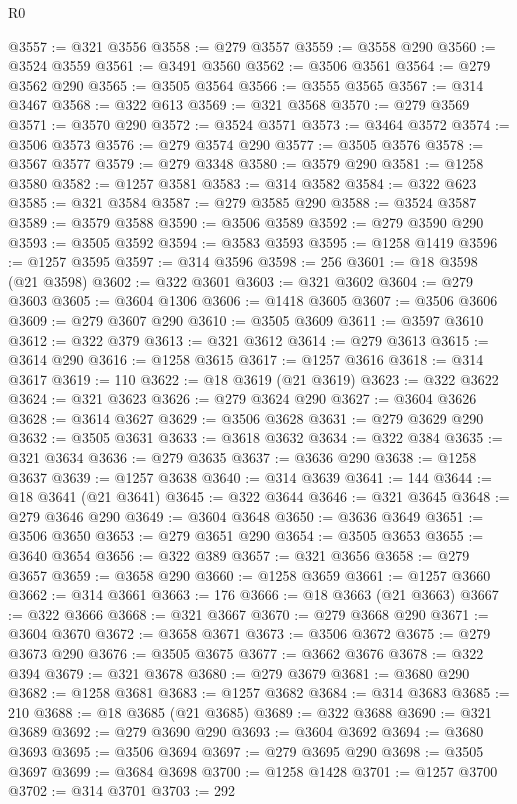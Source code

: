 \begin{lexlean}{R0}
\begin{coremodule}
@3557 := @321 @3556
@3558 := @279 @3557
@3559 := @3558 @290
@3560 := @3524 @3559
@3561 := @3491 @3560
@3562 := @3506 @3561
@3564 := @279 @3562 @290
@3565 := @3505 @3564
@3566 := @3555 @3565
@3567 := @314 @3467
@3568 := @322 @613
@3569 := @321 @3568
@3570 := @279 @3569
@3571 := @3570 @290
@3572 := @3524 @3571
@3573 := @3464 @3572
@3574 := @3506 @3573
@3576 := @279 @3574 @290
@3577 := @3505 @3576
@3578 := @3567 @3577
@3579 := @279 @3348
@3580 := @3579 @290
@3581 := @1258 @3580
@3582 := @1257 @3581
@3583 := @314 @3582
@3584 := @322 @623
@3585 := @321 @3584
@3587 := @279 @3585 @290
@3588 := @3524 @3587
@3589 := @3579 @3588
@3590 := @3506 @3589
@3592 := @279 @3590 @290
@3593 := @3505 @3592
@3594 := @3583 @3593
@3595 := @1258 @1419
@3596 := @1257 @3595
@3597 := @314 @3596
@3598 := 256
@3601 := @18 @3598 (@21 @3598)
@3602 := @322 @3601
@3603 := @321 @3602
@3604 := @279 @3603
@3605 := @3604 @1306
@3606 := @1418 @3605
@3607 := @3506 @3606
@3609 := @279 @3607 @290
@3610 := @3505 @3609
@3611 := @3597 @3610
@3612 := @322 @379
@3613 := @321 @3612
@3614 := @279 @3613
@3615 := @3614 @290
@3616 := @1258 @3615
@3617 := @1257 @3616
@3618 := @314 @3617
@3619 := 110
@3622 := @18 @3619 (@21 @3619)
@3623 := @322 @3622
@3624 := @321 @3623
@3626 := @279 @3624 @290
@3627 := @3604 @3626
@3628 := @3614 @3627
@3629 := @3506 @3628
@3631 := @279 @3629 @290
@3632 := @3505 @3631
@3633 := @3618 @3632
@3634 := @322 @384
@3635 := @321 @3634
@3636 := @279 @3635
@3637 := @3636 @290
@3638 := @1258 @3637
@3639 := @1257 @3638
@3640 := @314 @3639
@3641 := 144
@3644 := @18 @3641 (@21 @3641)
@3645 := @322 @3644
@3646 := @321 @3645
@3648 := @279 @3646 @290
@3649 := @3604 @3648
@3650 := @3636 @3649
@3651 := @3506 @3650
@3653 := @279 @3651 @290
@3654 := @3505 @3653
@3655 := @3640 @3654
@3656 := @322 @389
@3657 := @321 @3656
@3658 := @279 @3657
@3659 := @3658 @290
@3660 := @1258 @3659
@3661 := @1257 @3660
@3662 := @314 @3661
@3663 := 176
@3666 := @18 @3663 (@21 @3663)
@3667 := @322 @3666
@3668 := @321 @3667
@3670 := @279 @3668 @290
@3671 := @3604 @3670
@3672 := @3658 @3671
@3673 := @3506 @3672
@3675 := @279 @3673 @290
@3676 := @3505 @3675
@3677 := @3662 @3676
@3678 := @322 @394
@3679 := @321 @3678
@3680 := @279 @3679
@3681 := @3680 @290
@3682 := @1258 @3681
@3683 := @1257 @3682
@3684 := @314 @3683
@3685 := 210
@3688 := @18 @3685 (@21 @3685)
@3689 := @322 @3688
@3690 := @321 @3689
@3692 := @279 @3690 @290
@3693 := @3604 @3692
@3694 := @3680 @3693
@3695 := @3506 @3694
@3697 := @279 @3695 @290
@3698 := @3505 @3697
@3699 := @3684 @3698
@3700 := @1258 @1428
@3701 := @1257 @3700
@3702 := @314 @3701
@3703 := 292

\end{coremodule}
\end{lexlean}
